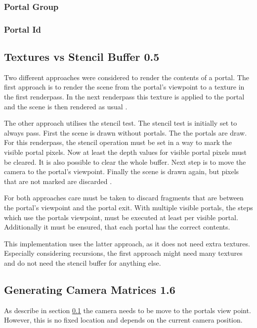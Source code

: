\subsubsection{Portal Group}

\subsubsection{Portal Id}


\subsection{Textures vs Stencil Buffer 0.5}
\label{section:textursVsStencil}
Two different approaches were considered to render the contents of a portal. The first approach is to render the scene from the portal's viewpoint to a texture in the first renderpass. In the next renderpass this texture is applied to the portal and the scene is then rendered as usual \cite{lecture:portalProblems}.  %

The other approach utilises the stencil test. The stencil test is initially set to always pass. First the scene is drawn without portals.
The the portals are draw. For this renderpass, the stencil operation must be set in a way to mark the visible portal pixels. Now at least the depth values for visible portal pixels must be cleared. It is also possible to clear the whole buffer. Next step is to move the camera to the portal's viewpoint. Finally the scene is drawn again, but pixels that are not marked are discarded \cites{schmalstieg:1999:sewing, lowe:2005:technique, lecture:portalProblems}.

For both approaches care must be taken to discard fragments that are between the portal's viewpoint and the portal exit. With multiple visible portals, the steps which use the portals viewpoint, must be executed at least per visible portal. Additionally it must be ensured, that each portal has the correct contents.

This implementation uses the latter approach, as it does not need extra textures. Especially considering recursions, the first approach might need many textures and do not need the stencil buffer for anything else.

\subsection{Generating Camera Matrices 1.6}
As describe in section \ref{section:textursVsStencil} the camera needs to be move to the portals view point. However, this is no fixed location and depends on the current camera position.

